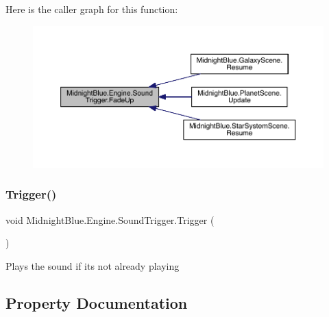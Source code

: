 Here is the caller graph for this function\+:
\nopagebreak
\begin{figure}[H]
\begin{center}
\leavevmode
\includegraphics[width=350pt]{class_midnight_blue_1_1_engine_1_1_sound_trigger_a97b79ca1906cdb3138da1f120d4c64fd_icgraph}
\end{center}
\end{figure}
\hypertarget{class_midnight_blue_1_1_engine_1_1_sound_trigger_a778de9a57b0567bab1d0c97c9084f1d0}{}\label{class_midnight_blue_1_1_engine_1_1_sound_trigger_a778de9a57b0567bab1d0c97c9084f1d0} 
\subsubsection{\texorpdfstring{Trigger()}{Trigger()}}
{\footnotesize\ttfamily void Midnight\+Blue.\+Engine.\+Sound\+Trigger.\+Trigger (\begin{DoxyParamCaption}{ }\end{DoxyParamCaption})\hspace{0.3cm}{\ttfamily [inline]}}



Plays the sound if it\textquotesingle{}s not already playing 



\subsection{Property Documentation}
\hypertarget{class_midnight_blue_1_1_engine_1_1_sound_trigger_a021b23bde55f005a31e4b55080deca65}{}\label{class_midnight_blue_1_1_engine_1_1_sound_trigger_a021b23bde55f005a31e4b55080deca65} 
